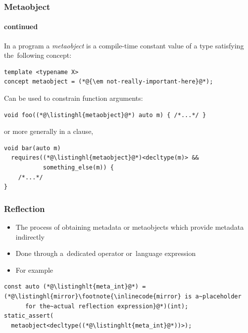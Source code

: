 \documentclass[compress,table,xcolor=table]{beamer}
\begin{document}
\begin{frame}[fragile]
  \frametitle{Metaobject}
  \framesubtitle{continued}
  \larger
  In a program a {\em metaobject} is a compile-time constant
    {\larger value} of a type satisfying the~following concept:
  \begin{lstlisting}[language=c++2x]
template <typename X>
concept metaobject = (*@{\em not-really-important-here}@*);
  \end{lstlisting}
  \vfill
  Can be used to constrain function arguments:
  \begin{lstlisting}[language=c++2x]
void foo((*@\listinghl{metaobject}@*) auto m) { /*...*/ }
  \end{lstlisting}
  or more generally in a  clause,
  \begin{lstlisting}[language=c++2x]
void bar(auto m)
  requires((*@\listinghl{metaobject}@*)<decltype(m)> &&
           something_else(m)) {
    /*...*/
}
  \end{lstlisting}
\end{frame}
\begin{frame}[fragile]
  \frametitle{Reflection}
  \larger
  \begin{itemize}
    \item The process of obtaining metadata or metaobjects which provide metadata
      indirectly
    \item Done through a~dedicated operator or~language expression
    \item For example
  \end{itemize}
  \begin{lstlisting}[language=c++2x]
const auto (*@\listinghlt{meta_int}@*) = (*@\listinghl{mirror}\footnote{\inlinecode{mirror} is a~placeholder
      for the~actual reflection expression}@*)(int);
static_assert(
  metaobject<decltype((*@\listinghlt{meta_int}@*))>);
  \end{lstlisting}
\end{frame}
\end{document}

